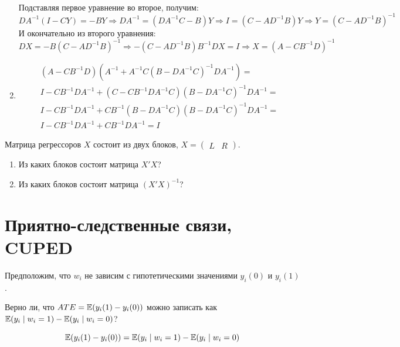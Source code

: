 \begin{problem}
\begin{sol}
\begin{enumerate}
\begin{align*}
\end{align*}
Подставляя первое уравнение во второе, получим:
\[
D A^{-1}(I-CY) = -BY \Rightarrow DA^{-1} = (DA^{-1}C- B)Y \Rightarrow I = (C - AD^{-1}B)Y \Rightarrow Y = (C - AD^{-1}B)^{-1}
\]
И окончательно из второго уравнения:
\[
DX = -B (C - AD^{-1}B)^{-1} \Rightarrow -(C - AD^{-1}B)B^{-1}DX = I \Rightarrow X = (A - CB^{-1}D)^{-1}
\]
\item
\begin{multline*}
(A - CB^{-1}D)(A^{-1} + A^{-1}C(B-DA^{-1}C)^{-1}DA^{-1}) = \\
I - CB^{-1}DA^{-1} + (C - CB^{-1}DA^{-1}C)(B-DA^{-1}C)^{-1}DA^{-1} = \\
I - CB^{-1}DA^{-1} + CB^{-1}(B - DA^{-1}C)(B-DA^{-1}C)^{-1}DA^{-1} = \\
I - CB^{-1}DA^{-1} + CB^{-1}DA^{-1} = I
\end{multline*}
\end{enumerate}
\end{sol}
\end{problem}

\begin{problem}
Матрица регрессоров $X$ состоит из двух блоков, $X=
\begin{pmatrix}
  L & R
\end{pmatrix}$.

\begin{enumerate}
  \item Из каких блоков состоит матрица $X'X$?
  \item Из каких блоков состоит матрица $(X'X)^{-1}$?
\end{enumerate}

\begin{sol}
\end{sol}

\end{problem}


\section{Приятно-следственные связи, CUPED}


\begin{problem}
Предположим, что $w_i$ не зависим с гипотетическими значениями $y_i(0)$
и $y_i(1)$.

Верно ли, что $ATE = \operatorname{\mathbb E}(y_i(1)  - y_i(0))$ можно записать как 
$\operatorname{\mathbb E}(y_i \mid w_i = 1) - \operatorname{\mathbb E}(y_i \mid w_i = 0)$?

\begin{sol}

\[  
  \operatorname{\mathbb E}(y_i(1)  - y_i(0)) = \operatorname{\mathbb E}(y_i \mid w_i = 1) - \operatorname{\mathbb E}(y_i \mid w_i = 0)
\]

\end{sol}

\end{problem}


